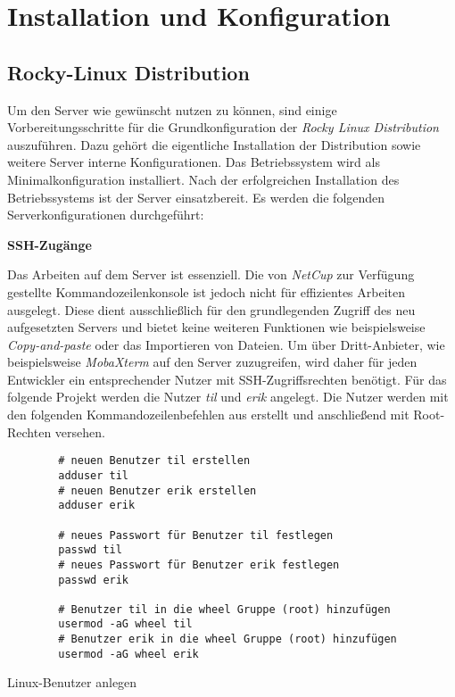 \chapter{Installation und Konfiguration}
\section{Rocky-Linux Distribution}
Um den Server wie gewünscht nutzen zu können, sind einige Vorbereitungsschritte für die Grundkonfiguration der \textit{Rocky Linux Distribution} auszuführen.
Dazu gehört die eigentliche Installation der Distribution sowie weitere Server interne Konfigurationen.
Das Betriebssystem wird als Minimalkonfiguration installiert.
Nach der erfolgreichen Installation des Betriebssystems ist der Server einsatzbereit.
Es werden die folgenden Serverkonfigurationen durchgeführt:

\textbf{SSH-Zugänge}

Das Arbeiten auf dem Server ist essenziell.
Die von \textit{NetCup} zur Verfügung gestellte Kommandozeilenkonsole ist jedoch nicht für effizientes Arbeiten ausgelegt.
Diese dient ausschließlich für den grundlegenden Zugriff des neu aufgesetzten Servers und bietet keine weiteren Funktionen wie beispielsweise \textit{Copy-and-paste} oder das Importieren von Dateien.
Um über Dritt-Anbieter, wie beispielsweise \textit{MobaXterm} auf den Server zuzugreifen, wird daher für jeden Entwickler ein entsprechender Nutzer mit \ac{SSH}-Zugriffsrechten benötigt.
Für das folgende Projekt werden die Nutzer \textit{til} und \textit{erik} angelegt.
Die Nutzer werden mit den folgenden Kommandozeilenbefehlen aus  erstellt und anschließend mit Root-Rechten versehen.

\begin{code}
    \begin{verbatim}
        # neuen Benutzer til erstellen
        adduser til
        # neuen Benutzer erik erstellen
        adduser erik

        # neues Passwort für Benutzer til festlegen
        passwd til
        # neues Passwort für Benutzer erik festlegen
        passwd erik

        # Benutzer til in die wheel Gruppe (root) hinzufügen
        usermod -aG wheel til
        # Benutzer erik in die wheel Gruppe (root) hinzufügen
        usermod -aG wheel erik
    \end{verbatim}
    \caption[Linux-Benutzer anlegen]{Linux-Benutzer anlegen}
    \label{Linux-Benutzer anlegen}
\end{code}

